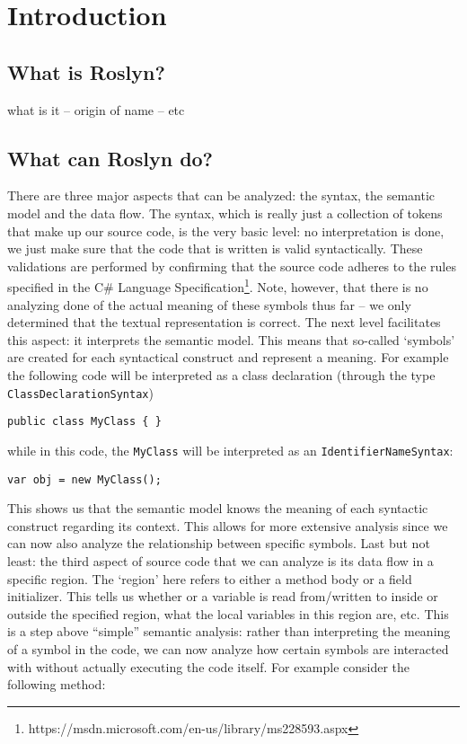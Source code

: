 \chapter{Introduction}
\label{ch:introduction}

\section{What is Roslyn?}
\label{sec:intro-what?}

what is it -- origin of name -- etc

\section{What can Roslyn do?}
\label{sec:intro-what-can}

There are three major aspects that can be analyzed: the syntax, the semantic model and the data flow. 
The syntax, which is really just a collection of tokens that make up our source code, is the very basic level: no interpretation is done, we just make sure that the code that is written is valid syntactically. These validations are performed by confirming that the source code adheres to the rules specified in the C\# Language Specification\footnote{https://msdn.microsoft.com/en-us/library/ms228593.aspx}. Note, however, that there is no analyzing done of the actual meaning of these symbols thus far – we only determined that the textual representation is correct.
The next level facilitates this aspect: it interprets the semantic model. This means that so-called ‘symbols’ are created for each syntactical construct and represent a meaning. For example the following code will be interpreted as a class declaration (through the type \verb|ClassDeclarationSyntax|)

\begin{lstlisting}
public class MyClass { }
\end{lstlisting}

	
while in this code, the \verb|MyClass| will be interpreted as an \verb|IdentifierNameSyntax|:

   
\begin{lstlisting}
var obj = new MyClass();
\end{lstlisting}  
	
This shows us that the semantic model knows the meaning of each syntactic construct regarding its context. This allows for more extensive analysis since we can now also analyze the relationship between specific symbols. 
Last but not least: the third aspect of source code that we can analyze is its data flow in a specific region. The ‘region’ here refers to either a method body or a field initializer. This tells us whether or a variable is read from/written to inside or outside the specified region, what the local variables in this region are, etc. This is a step above “simple” semantic analysis: rather than interpreting the meaning of a symbol in the code, we can now analyze how certain symbols are interacted with without actually executing the code itself.
For example consider the following method:

